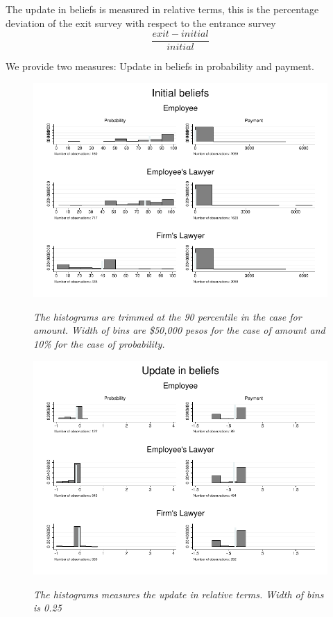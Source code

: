 \documentclass[12pt]{article}
\theoremstyle{named}
\newcommand{\folder}{C:/Users/chasi_000/Dropbox/Statistics/P10/Results/Results_2/Effect}
\begin{document}
The update in beliefs is measured in relative terms, this is the percentage deviation of the exit survey with respect to the entrance survey
\[\frac{exit-initial}{initial}\]

 We provide two measures: Update in beliefs in probability and payment.\\

\begin{center}
\scriptsize{}
\end{center}



\begin{figure}[H]
\label{diff}
\begin{center}
\includegraphics[width=\textwidth]{./Figures/belief.pdf}
\end{center}
{\footnotesize \textit{The histograms are trimmed at the 90 percentile in the case for amount. Width of bins are \$50,000 pesos for the case of amount and 10\% for the case of probability.}}
\end{figure}


\begin{figure}[H]
\label{update}
\begin{center}
\includegraphics[width=\textwidth]{./Figures/update_belief.pdf}
\end{center}
{\footnotesize \textit{The histograms measures the update in relative terms. Width of bins is 0.25 }}
\end{figure}
\end{document}
